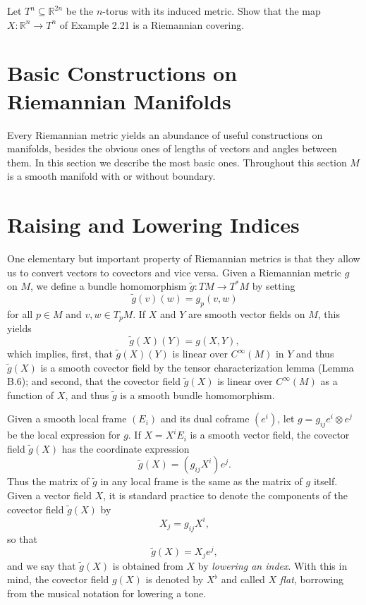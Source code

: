 \begin{exercise}
\label{exer:torus-covering}
Let $T^n \subseteq \mathbb{R}^{2n}$ be the $n$-torus with its induced metric. Show that the map $X: \mathbb{R}^n \to T^n$ of Example 2.21 is a Riemannian covering.
\end{exercise}

\section{Basic Constructions on Riemannian Manifolds}

Every Riemannian metric yields an abundance of useful constructions on manifolds, besides the obvious ones of lengths of vectors and angles between them. In this section we describe the most basic ones. Throughout this section $M$ is a smooth manifold with or without boundary.

\section{Raising and Lowering Indices}

One elementary but important property of Riemannian metrics is that they allow us to convert vectors to covectors and vice versa. Given a Riemannian metric $g$ on $M$, we define a bundle homomorphism $\tilde{g} : TM \to T^* M$ by setting
\[
\tilde{g}(v)(w) = g_p(v,w)
\]
for all $p \in M$ and $v,w \in T_p M$. If $X$ and $Y$ are smooth vector fields on $M$, this yields
\[
\tilde{g}(X)(Y) = g(X,Y),
\]
which implies, first, that $\tilde{g}(X)(Y)$ is linear over $C^\infty(M)$ in $Y$ and thus $\tilde{g}(X)$ is a smooth covector field by the tensor characterization lemma (Lemma B.6); and second, that the covector field $\tilde{g}(X)$ is linear over $C^\infty(M)$ as a function of $X$, and thus $\tilde{g}$ is a smooth bundle homomorphism.

Given a smooth local frame $(E_i)$ and its dual coframe $(e^i)$, let $g = g_{ij} e^i \otimes e^j$ be the local expression for $g$. If $X = X^i E_i$ is a smooth vector field, the covector field $\tilde{g}(X)$ has the coordinate expression
\[
\tilde{g}(X) = (g_{ij}X^i)e^j.
\]
Thus the matrix of $\tilde{g}$ in any local frame is the same as the matrix of $g$ itself. Given a vector field $X$, it is standard practice to denote the components of the covector field $\tilde{g}(X)$ by
\[
X_j = g_{ij}X^i,
\]
so that
\[
\tilde{g}(X) = X_j e^j,
\]
and we say that $\tilde{g}(X)$ is obtained from $X$ by \textit{lowering an index}. With this in mind, the covector field $g(X)$ is denoted by $X^\flat$ and called $X$ \textit{flat}, borrowing from the musical notation for lowering a tone.

